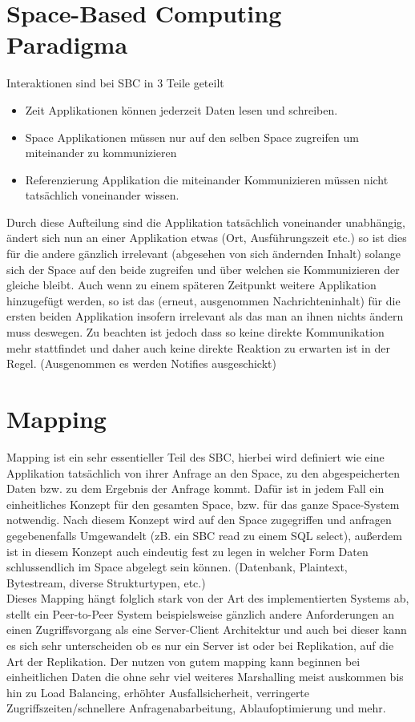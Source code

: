\documentclass[a4paper,12pt]{scrreprt}
\begin{document}
	\section{Space-Based Computing Paradigma}
		Interaktionen sind bei SBC in 3 Teile geteilt 
		\begin{itemize}
			\item Zeit
				\subitem Applikationen können jederzeit Daten lesen und schreiben.
			\item Space
				\subitem Applikationen müssen nur auf den selben Space zugreifen um miteinander zu kommunizieren
			\item Referenzierung
				\subitem Applikation die miteinander Kommunizieren müssen nicht tatsächlich voneinander wissen.
		\end{itemize}
		Durch diese Aufteilung sind die Applikation tatsächlich voneinander unabhängig, ändert sich nun an einer Applikation etwas (Ort, Ausführungszeit etc.) so ist dies für die andere gänzlich irrelevant (abgesehen von sich ändernden Inhalt) solange sich der Space auf den beide zugreifen und über welchen sie Kommunizieren der gleiche bleibt. Auch wenn zu einem späteren Zeitpunkt weitere Applikation hinzugefügt werden, so ist das (erneut, ausgenommen Nachrichteninhalt) für die ersten beiden Applikation insofern irrelevant als das man an ihnen nichts ändern muss deswegen. Zu beachten ist jedoch dass so keine direkte Kommunikation mehr stattfindet und daher auch keine direkte Reaktion zu erwarten ist in der Regel. (Ausgenommen es werden Notifies ausgeschickt)
		
		
		
	\section{Mapping}
		Mapping ist ein sehr essentieller Teil des SBC, hierbei wird definiert wie eine Applikation tatsächlich von ihrer Anfrage an den Space, zu den abgespeicherten Daten bzw. zu dem Ergebnis der Anfrage kommt. Dafür ist in jedem Fall ein einheitliches Konzept für den gesamten Space, bzw. für das ganze Space-System notwendig. Nach diesem Konzept wird auf den Space zugegriffen und anfragen gegebenenfalls Umgewandelt (zB. ein SBC read zu einem SQL select), außerdem ist in diesem Konzept auch eindeutig fest zu legen in welcher Form Daten schlussendlich im Space abgelegt sein können. (Datenbank, Plaintext, Bytestream, diverse Strukturtypen, etc.) \\
		Dieses Mapping hängt folglich stark von der Art des implementierten Systems ab, stellt ein Peer-to-Peer System beispielsweise gänzlich andere Anforderungen an einen Zugriffsvorgang als eine Server-Client Architektur und auch bei dieser kann es sich sehr unterscheiden ob es nur ein Server ist oder bei Replikation, auf die Art der Replikation. Der nutzen von gutem mapping kann beginnen bei einheitlichen Daten die ohne sehr viel weiteres Marshalling meist auskommen bis hin zu Load Balancing, erhöhter Ausfallsicherheit, verringerte Zugriffszeiten/schnellere Anfragenabarbeitung, Ablaufoptimierung und mehr.
	
\end{document}
